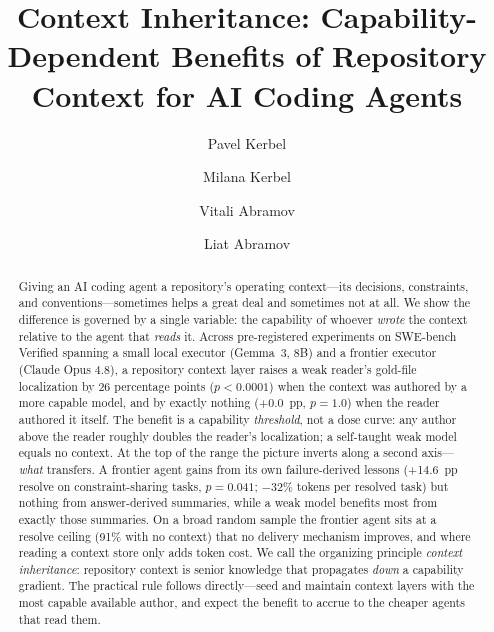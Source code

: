 \documentclass[sigconf,nonacm]{acmart}
\begin{document}
\title{Context Inheritance: Capability-Dependent Benefits of Repository
Context for AI Coding Agents}

\author{Pavel Kerbel}
\author{Milana Kerbel}
\author{Vitali Abramov}
\author{Liat Abramov}

\begin{abstract}
Giving an AI coding agent a repository's operating context---its decisions,
constraints, and conventions---sometimes helps a great deal and sometimes not
at all. We show the difference is governed by a single variable: the capability
of whoever \emph{wrote} the context relative to the agent that \emph{reads} it.
Across pre-registered experiments on SWE-bench Verified spanning a small local
executor (Gemma~3, 8B) and a frontier executor (Claude Opus 4.8), a repository
context layer raises a weak reader's gold-file localization by 26 percentage
points ($p<0.0001$) when the context was authored by a more capable model, and
by exactly nothing ($+0.0$~pp, $p=1.0$) when the reader authored it itself. The
benefit is a capability \emph{threshold}, not a dose curve: any author above the
reader roughly doubles the reader's localization; a self-taught weak model
equals no context. At the top of the range the picture inverts along a second
axis---\emph{what} transfers. A frontier agent gains from its own
failure-derived lessons (+14.6~pp resolve on constraint-sharing tasks,
$p=0.041$; $-32\%$ tokens per resolved task) but nothing from answer-derived
summaries, while a weak model benefits most from exactly those summaries. On a
broad random sample the frontier agent sits at a resolve ceiling (91\% with no
context) that no delivery mechanism improves, and where reading a context store
only adds token cost. We call the organizing principle \emph{context
inheritance}: repository context is senior knowledge that propagates
\emph{down} a capability gradient. The practical rule follows directly---seed and
maintain context layers with the most capable available author, and expect the
benefit to accrue to the cheaper agents that read them.
\end{abstract}
\end{document}
